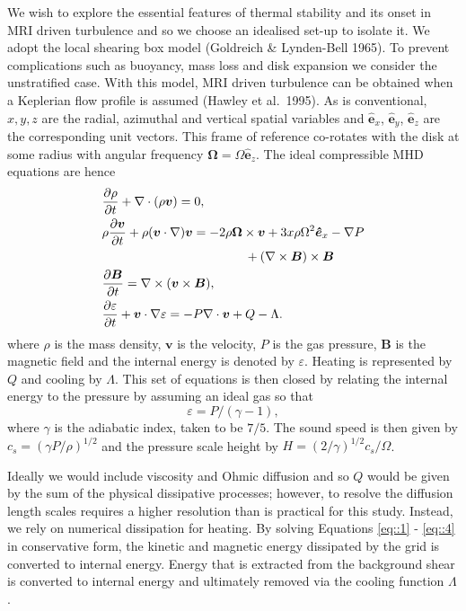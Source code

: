 \documentclass[useAMS]{mn2e}
\begin{document}
We wish to explore the essential features of thermal stability and its
onset in MRI driven turbulence and so we choose an idealised set-up to
isolate it. We adopt the local shearing box model (Goldreich \&
Lynden-Bell 1965). To prevent complications such as buoyancy, mass
loss and disk expansion we consider the unstratified case. With this
model, MRI driven turbulence can be obtained when a Keplerian flow
profile is assumed (Hawley et al.~1995). As is conventional, $x,y,z$
are the radial, azimuthal and vertical spatial variables and
$\boldsymbol{\hat{e}}_{x}$, $\boldsymbol{\hat{e}}_{y}$,
$\boldsymbol{\hat{e}}_{z}$ are the corresponding unit vectors. This
frame of reference co-rotates with the disk at some radius
with angular frequency
$\mathbf{\Omega}=\Omega\boldsymbol{\hat{e}}_z$.
The ideal compressible MHD equations are hence
\begin{align}
\label{eq::1}
&\frac{\partial \rho}{ \partial t} + \nabla \cdot ( \rho \boldsymbol{v}
) = 0, \\
&\rho \frac{\partial \boldsymbol{v}}{\partial t} +\rho (\boldsymbol{v}
\cdot \nabla)\boldsymbol{v} 
 = - 2 \rho \mathbf{\Omega} \times \boldsymbol{v}  +
3x\rho \Omega^{2}\boldsymbol{\hat{e}}_{x}-\nabla P \notag\\
& \hskip4cm  +( \nabla \times \boldsymbol{B} ) \times \boldsymbol{B} \\
&\frac{\partial \boldsymbol{B}}{\partial t} = \nabla \times
(\boldsymbol{v} \times \boldsymbol{B}), \\
&\frac{\partial \varepsilon}{\partial t} + \boldsymbol{v}\cdot\nabla
\varepsilon= -P\nabla\cdot\boldsymbol{v} +Q -\Lambda.
\label{eq::4}
\end{align}
where $\rho$ is the mass density, $\boldsymbol{v}$ is the velocity, 
 $P$ is the gas pressure, $\boldsymbol{B}$ is the magnetic field and the internal energy is
denoted by $\varepsilon$. Heating is represented by $Q$ and cooling by
$\Lambda$. 
This set of equations is then closed by relating the internal energy to the pressure by assuming an ideal gas so that
\begin{equation}
\varepsilon= P/(\gamma-1),
\end{equation}
where $\gamma$ is the adiabatic index, taken to be $7/5$. The sound speed is then given by $c_{s}=(\gamma P/\rho)^{1/2}$ and the
pressure scale height by $H=(2/\gamma)^{1/2}c_{s}/\Omega$. 


Ideally we would include viscosity and Ohmic diffusion and so $Q$ would
be given by the sum of the physical dissipative processes; 
however, to resolve
the diffusion length scales requires a higher resolution than is
practical for this study. Instead, we rely on numerical dissipation
for heating. By solving Equations \eqref{eq::1} - \eqref{eq::4} in
conservative form, the kinetic and magnetic energy dissipated by the
grid is converted to internal energy. Energy that is extracted from
the background shear is converted to internal energy and ultimately
removed via the cooling function $\Lambda$. 
\end{document}
